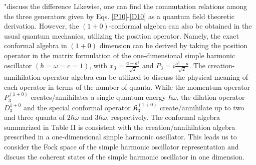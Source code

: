 \documentclass[%
 reprint,
superscriptaddress,
 amsmath,amssymb,
 aps,
]{revtex4-2}
\begin{document}
\begin{table}[h!]
\centering
\caption{\label{tabeIFD10}$1+0$ conformal algebra in IFD}
\end{table}

{\color{red} "discuss the difference }
Likewise, one can find the commutation relations among the three generators given by Eqs. \eqref{P10}-\eqref{D10} as a quantum field theoretic derivation. However, the $(1+0)$-conformal algebra can also be obtained in the usual quantum mechanics, utilizing the position operator. Namely, the exact conformal algebra in $(1+0)$ dimension can be derived by taking the position operator in the matrix formulation of the one-dimensional simple harmonic oscillator $(\hbar=\omega=c=1)$, with $x_3=\frac{a+a^{\dagger}}{\sqrt{2}}$ and $P_3=i\frac{a^{\dagger}-a}{\sqrt{2}}$.
The creation-annihilation operator algebra can be utilized to discuss the physical meaning of each operator in terms of the number of quanta. While the momentum operator $P_3^{(1+0)}$ creates/annihilates a single quantum energy $\hbar \omega$, the dilation operator $D_3^{1+0}$ and the special conformal operator $\mathfrak{K}_{{3}}^{(1+0)}$ create/annihilate up to two and three quanta of $2\hbar\omega$ and $3\hbar\omega$, respectively.
The conformal algebra summarized in Table II is consistent with the creation/annihilation algebra prescribed in a one-dimensional simple harmonic oscillator.  
This leads us to consider the Fock space of the simple harmonic oscillator representation and discuss the coherent states of the simple harmonic oscillator in one dimension. 
\end{document}

